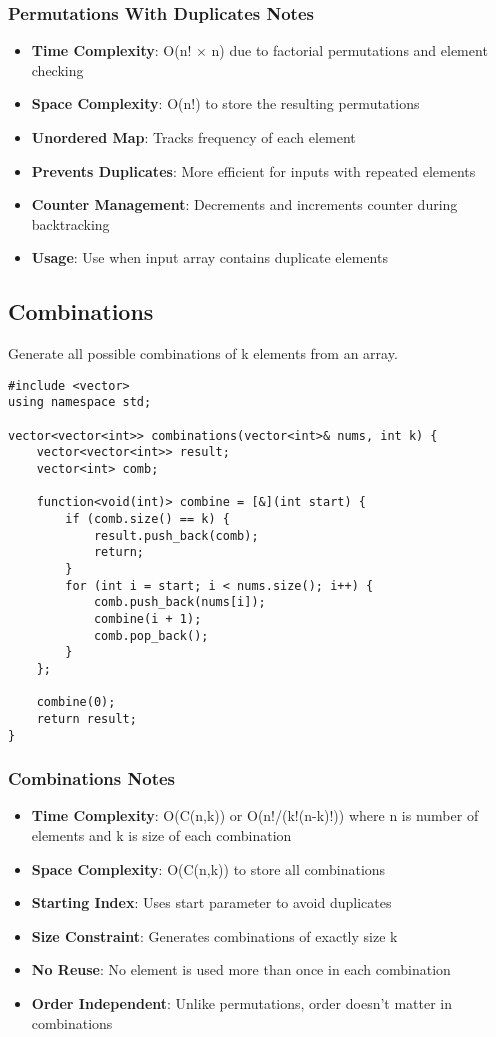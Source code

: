 \documentclass[11pt,a4paper]{article}
\begin{document}
\subsubsection{Permutations With Duplicates Notes}
\begin{itemize}
\item \textbf{Time Complexity}: O(n! × n) due to factorial permutations and element checking
\item \textbf{Space Complexity}: O(n!) to store the resulting permutations
\item \textbf{Unordered Map}: Tracks frequency of each element
\item \textbf{Prevents Duplicates}: More efficient for inputs with repeated elements
\item \textbf{Counter Management}: Decrements and increments counter during backtracking
\item \textbf{Usage}: Use when input array contains duplicate elements
\end{itemize}

\newpage
\subsection{Combinations}
Generate all possible combinations of k elements from an array.

\begin{lstlisting}[caption={Combinations Implementation}]
#include <vector>
using namespace std;

vector<vector<int>> combinations(vector<int>& nums, int k) {
    vector<vector<int>> result;
    vector<int> comb;

    function<void(int)> combine = [&](int start) {
        if (comb.size() == k) {
            result.push_back(comb);
            return;
        }
        for (int i = start; i < nums.size(); i++) {
            comb.push_back(nums[i]);
            combine(i + 1);
            comb.pop_back();
        }
    };

    combine(0);
    return result;
}
\end{lstlisting}

\subsubsection{Combinations Notes}
\begin{itemize}
\item \textbf{Time Complexity}: O(C(n,k)) or O(n!/(k!(n-k)!)) where n is number of elements and k is size of each combination
\item \textbf{Space Complexity}: O(C(n,k)) to store all combinations
\item \textbf{Starting Index}: Uses start parameter to avoid duplicates
\item \textbf{Size Constraint}: Generates combinations of exactly size k
\item \textbf{No Reuse}: No element is used more than once in each combination
\item \textbf{Order Independent}: Unlike permutations, order doesn't matter in combinations
\end{itemize}
\end{document}
